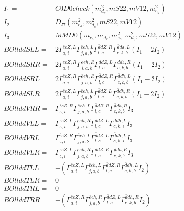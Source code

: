 \documentclass[A4,landscape]{article}
\begin{document}
\begin{align} 
I_1 = & C0D0check(m^2_{d_{{c}}}, mS22, mV12, m^2_{e_{{a}}}) \\ 
I_2 = & D_{27}(m^2_{e_{{a}}}, m^2_{d_{{c}}}, mS22, mV12) \\ 
I_3 = & MMD0(m_{e_{{a}}}, m_{d_{{c}}}, m^2_{e_{{a}}}, m^2_{d_{{c}}}, mS22, mV12) \\ 
  BOllddSLL= & 2  \Gamma^{\bar{e}e Z ,L}_{a, i} \Gamma^{\bar{e}e h ,L}_{j, a, b} \Gamma^{\bar{d}d Z ,R}_{l, c} \Gamma^{\bar{d}d h ,L}_{c, k, b} (I_1 - 2 I_2) \\ 
  BOllddSRR= & 2  \Gamma^{\bar{e}e Z ,R}_{a, i} \Gamma^{\bar{e}e h ,R}_{j, a, b} \Gamma^{\bar{d}d Z ,L}_{l, c} \Gamma^{\bar{d}d h ,R}_{c, k, b} (I_1 - 2 I_2) \\ 
  BOllddSRL= & 2  \Gamma^{\bar{e}e Z ,R}_{a, i} \Gamma^{\bar{e}e h ,R}_{j, a, b} \Gamma^{\bar{d}d Z ,R}_{l, c} \Gamma^{\bar{d}d h ,L}_{c, k, b} (I_1 - 2 I_2) \\ 
  BOllddSLR= & 2  \Gamma^{\bar{e}e Z ,L}_{a, i} \Gamma^{\bar{e}e h ,L}_{j, a, b} \Gamma^{\bar{d}d Z ,L}_{l, c} \Gamma^{\bar{d}d h ,R}_{c, k, b} (I_1 - 2 I_2) \\ 
  BOllddVRR= &  \Gamma^{\bar{e}e Z ,R}_{a, i} \Gamma^{\bar{e}e h ,L}_{j, a, b} \Gamma^{\bar{d}d Z ,R}_{l, c} \Gamma^{\bar{d}d h ,R}_{c, k, b} I_3 \\ 
  BOllddVLL= &  \Gamma^{\bar{e}e Z ,L}_{a, i} \Gamma^{\bar{e}e h ,R}_{j, a, b} \Gamma^{\bar{d}d Z ,L}_{l, c} \Gamma^{\bar{d}d h ,L}_{c, k, b} I_3 \\ 
  BOllddVRL= &  \Gamma^{\bar{e}e Z ,R}_{a, i} \Gamma^{\bar{e}e h ,L}_{j, a, b} \Gamma^{\bar{d}d Z ,L}_{l, c} \Gamma^{\bar{d}d h ,L}_{c, k, b} I_3 \\ 
  BOllddVLR= &  \Gamma^{\bar{e}e Z ,L}_{a, i} \Gamma^{\bar{e}e h ,R}_{j, a, b} \Gamma^{\bar{d}d Z ,R}_{l, c} \Gamma^{\bar{d}d h ,R}_{c, k, b} I_3 \\ 
  BOllddTLL= & -( \Gamma^{\bar{e}e Z ,L}_{a, i} \Gamma^{\bar{e}e h ,L}_{j, a, b} \Gamma^{\bar{d}d Z ,R}_{l, c} \Gamma^{\bar{d}d h ,L}_{c, k, b} I_2) \\ 
  BOllddTLR= & 0 \\ 
  BOllddTRL= & 0 \\ 
  BOllddTRR= & -( \Gamma^{\bar{e}e Z ,R}_{a, i} \Gamma^{\bar{e}e h ,R}_{j, a, b} \Gamma^{\bar{d}d Z ,L}_{l, c} \Gamma^{\bar{d}d h ,R}_{c, k, b} I_2) \\ 
\end{align} 
\end{document}
